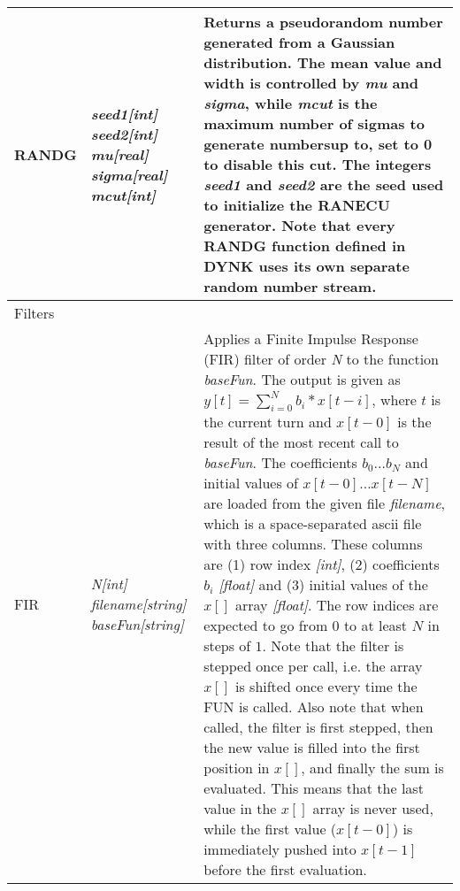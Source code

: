 \documentclass[a4paper,11pt]{report}
\begin{document}
\begin{center}
\begin{longtable}{|p{2.25cm} | p{4cm} p{9.5cm}|}
  RANDG      & \emph{seed1[int] seed2[int] mu[real] sigma[real] mcut[int]} &
  Returns a pseudorandom number generated from a Gaussian distribution.
  The mean value and width is controlled by \emph{mu} and \emph{sigma}, while \emph{mcut} is the maximum number of sigmas to generate numbersup to, set to 0 to disable this cut. 
  The integers \emph{seed1} and \emph{seed2} are the seed used to initialize the RANECU generator. 
  Note that every RANDG function defined in DYNK uses its own separate random number stream.\\


  
  \hline
  \rowcolor{blue!15}
  Filters & & \\*
  
  FIR        & \emph{N[int] filename[string] baseFun[string]} &
  Applies a Finite Impulse Response (FIR) filter of order \emph{N} to the function \emph{baseFun}.
  The output is given as $y[t] = \sum_{i=0}^N b_i*x[t-i]$, where $t$ is the current turn and $x[t-0]$ is the result of the most recent call to \emph{baseFun}.
  The coefficients $b_0 \ldots b_N$ and initial values of $x[t-0]\ldots x[t-N]$ are loaded from the given file \emph{filename}, which is a space-separated ascii file with three columns.
  These columns are (1) row index \emph{[int]}, (2) coefficients $b_i$ \emph{[float]} and (3) initial values of the $x[]$ array \emph{[float]}.
  The row indices are expected to go from $0$ to at least $N$ in steps of $1$.
  Note that the filter is stepped once per call, i.e. the array $x[]$ is shifted once every time the FUN is called.
  Also note that when called, the filter is first stepped, then the new value is filled into the first position in $x[]$, and finally the sum is evaluated.
  This means that the last value in the $x[]$ array is never used, while the first value ($x[t-0]$) is immediately pushed into $x[t-1]$ before the first evaluation.\\*
  

\end{longtable}
\end{center}
\end{document}
